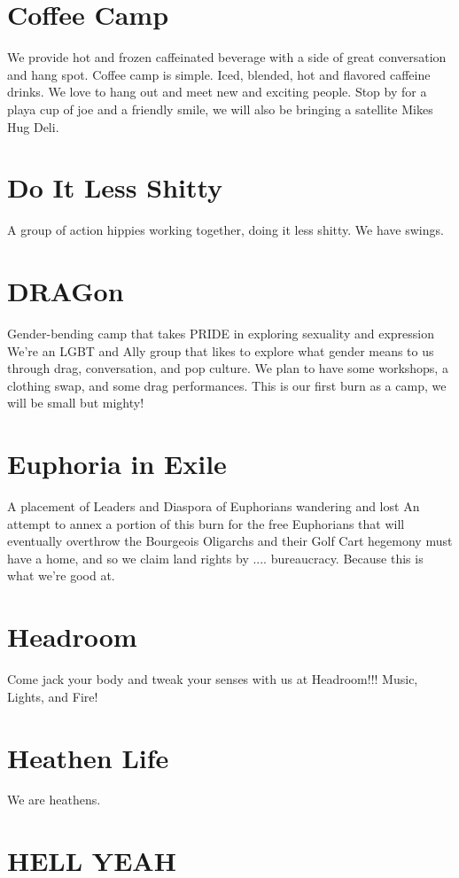 \begin{multicols}{2}
\section*{Coffee Camp}
We provide hot and frozen caffeinated beverage with a side of great conversation and hang spot. Coffee camp is simple. Iced, blended, hot and flavored caffeine drinks. We love to hang out and meet new and exciting people. Stop by for a playa cup of joe and a friendly smile, we will also be bringing a satellite Mikes Hug Deli.


\section*{Do It Less Shitty}
A group of action hippies working together, doing it less shitty. We have swings.


\section*{DRAGon}
Gender-bending camp that takes PRIDE in exploring sexuality and expression
We're an LGBT and Ally group that likes to explore what gender means to us through drag, conversation, and pop culture. We plan to have some workshops, a clothing swap, and some drag performances. This is our first burn as a camp, we will be small but mighty!


\section*{Euphoria in Exile}
A placement of Leaders and Diaspora of Euphorians wandering and lost
An attempt to annex a portion of this burn for the free Euphorians that will eventually overthrow the Bourgeois Oligarchs and their Golf Cart hegemony must have a home, and so we claim land rights by .... bureaucracy. Because this is what we're good at. 


\section*{Headroom}
Come jack your body and tweak your senses with us at Headroom!!! Music, Lights, and Fire!




\section*{Heathen Life}
We are heathens. 


\section*{HELL YEAH}


\end{multicols}
